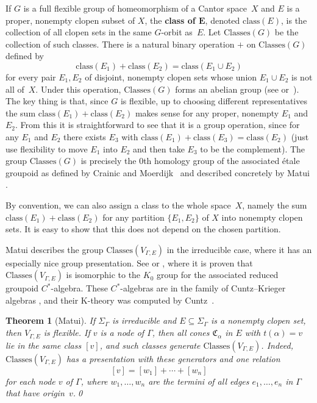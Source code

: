 \documentclass[11pt,letterpaper]{amsart}
\newtheorem{theorem}{Theorem}[section]
\theoremstyle{definition}
\newcommand{\newword}[1]{\textbf{#1}}
\newcommand{\C}{\mathfrak{C}}
\newcommand{\Classes}{\mathrm{Classes}}
\newcommand{\class}{\mathrm{class}}
\begin{document}
If $G$ is a full flexible group of homeomorphism of a Cantor space~$X$ and $E$ is a proper, nonempty clopen subset of $X$, the \newword{class of $\boldsymbol{E}$}, denoted $\class(E)$, is the collection of all clopen sets in the same $G$-orbit as~$E$.  Let $\Classes(G)$ be the collection of such classes.  There is a natural binary operation $+$ on $\Classes(G)$ defined by
\[
\class(E_1) + \class(E_2) = \class(E_1\cup E_2)
\]
for every pair $E_1,E_2$ of disjoint, nonempty clopen sets whose union $E_1\cup E_2$ is not all of~$X$.  Under this operation, $\Classes(G)$ forms an abelian group (see \cite[Section~6.2]{Matui15} or~\cite[Section~3]{BleakElliottHyde}).  The key thing is that, since $G$ is flexible, up to choosing different representatives the sum $\class(E_1)+\class(E_2)$ makes sense for any proper, nonempty $E_1$ and $E_2$.  From this it is straightforward to see that it is a group operation, since for any $E_1$ and $E_2$ there exists $E_3$ with $\class(E_1)+\class(E_3)=\class(E_2)$ (just use flexibility to move $E_1$ into $E_2$ and then take $E_3$ to be the complement).  The group $\Classes(G)$ is precisely the $0$th homology group of the associated \'etale groupoid as defined by Crainic and Moerdijk~\cite{CrainicMoerdijk} and described concretely by Matui \cite{Matui12}.  

By convention, we can also assign a class to the whole space~$X$, namely the sum $\class(E_1)+\class(E_2)$ for any partition $\{E_1,E_2\}$ of $X$ into nonempty clopen sets.  It is easy to show that this does not depend on the chosen partition.

Matui describes the group $\Classes(V_{\Gamma,E})$ in the irreducible case, where it has an especially nice group presentation. See \cite[Section~6.1]{Matui15} or \cite[Theorem~4.14]{Matui12}, where it is proven that $\Classes(V_{\Gamma,E})$ is isomorphic to the $K_0$ group for the associated reduced groupoid \mbox{$C^*$-algebra}.  These $C^*$-algebras are in the family of Cuntz--Krieger algebras \cite{CuntzKrieger}, and their \mbox{K-theory} was computed by Cuntz~\cite{Cuntz}.

\begin{theorem}[Matui]
\label{thm:ClassesVGammaE}
If\/ $\Sigma_\Gamma$ is irreducible and $E\subseteq \Sigma_\Gamma$ is a nonempty clopen set, then $V_{\Gamma,E}$ is flexible.  If $v$ is a node of\/ $\Gamma$, then all cones\/ $\C_\alpha$ in $E$ with $t(\alpha)=v$ lie in the same class\/ $[v]$, and such classes generate\/ $\Classes(V_{\Gamma,E})$.  Indeed, $\Classes(V_{\Gamma,E})$ has a presentation with these generators and one relation
\[
[v] = [w_1] + \cdots + [w_n]
\]
for each node $v$ of\/ $\Gamma$, where $w_1,\ldots,w_n$ are the termini of all edges $e_1,\ldots,e_n$ in\/ $\Gamma$ that have origin~$v$.\qed
\end{theorem}
\end{document}

